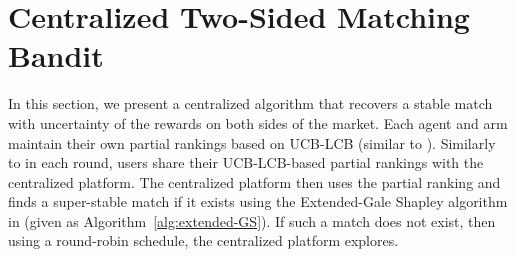 \documentclass{article}
\newtheorem{lemma}[theorem]{Lemma}
\begin{document}



\section{Centralized Two-Sided Matching Bandit}
In this section, we present a centralized algorithm that recovers a stable match with uncertainty of the rewards on both sides of the market. Each agent and arm maintain their own partial rankings based on UCB-LCB (similar to \cite{kong2023playeroptimal}). Similarly to \cite{liu_centralized_2020} in each round, users share their UCB-LCB-based partial rankings with the centralized platform. The centralized platform then uses the partial ranking and finds a super-stable match if it exists using the Extended-Gale Shapley algorithm in \cite{irving1994stable} (given as Algorithm~\ref{alg:extended-GS}). If such a match does not exist, then using a round-robin schedule, the centralized platform explores. 
\end{document}
